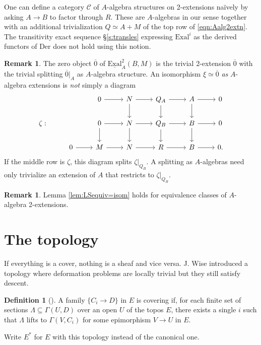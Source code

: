 \documentclass[11pt,reqno]{amsart}
\theoremstyle{definition}
\newtheorem{definition}[theorem]{Definition}
\newtheorem{remark}[theorem]{Remark}
\newcommand{\Der}{\textrm{Der}}
\newcommand{\EExal}{\underline{\textrm{Exal}}}
\newcommand{\Exal}{\textrm{Exal}}
\newcommand{\cal}[1]{\ensuremath{\mathcal{#1}}}
\renewcommand{\bar}[1]{\overline{#1}}
\begin{document}
One can define a category $\cal C$ of $A$-algebra structures on 2-extensions na\"ively by asking $A \to B$ to factor through $R$. These are $A$-algebras in our sense together with an additional trivialization $Q \simeq A+M$ of the top row of \eqref{eqn:Aalg2extn}. The transitivity exact sequence \S \ref{s:transles} expressing $\Exal^i$ as the derived functors of $\Der$ does not hold using this notion. 



\begin{remark}
The zero object $\bar 0$ of $\EExal_A^2(B, M)$ is the trivial 2-extension $\bar 0$ with the trivial splitting $\bar 0|_A$ as $A$-algebra structure. An isomorphism $\xi \simeq \bar 0$ \emph{as} $A$-algebra extensions is \emph{not} simply a diagram
\[\begin{tikzcd}
 &&0 \ar[r] &N \ar[r] \ar[d] &Q_A \ar[r] \ar[d] &A \ar[r] \ar[d] &0 \\
\zeta : &&0 \ar[r] \ar[d] &N \ar[r] \ar[d] &Q_B \ar[r] \ar[d] &B \ar[r] \ar[d] &0 \\
&0 \ar[r] &M \ar[r] &N \ar[r] &R \ar[r] &B \ar[r] &0.
\end{tikzcd}\]
If the middle row is $\zeta$, this diagram splits $\zeta|_{Q_B}$. A splitting as $A$-algebras need only trivialize an extension of $A$ that restricts to $\zeta|_{Q_B}$.  
\end{remark}


\begin{remark}
Lemma \ref{lem:LSequiv=isom} holds for equivalence classes of $A$-algebra 2-extensions. 
\end{remark}






\section{The topology}


If everything is a cover, nothing is a sheaf and vice versa. J. Wise introduced a topology where deformation problems are locally trivial but they still satisfy descent. 

\begin{definition}[{\cite{wisealgs1}}]\label{defn:wisetop}
A family $\{C_i \to D\}$ in $E$ is covering if, for each finite set of sections $\Lambda \subseteq \Gamma(U, D)$ over an open $U$ of the topos $E$, there exists a single $i$ such that $\Lambda$ lifts to $\Gamma(V, C_i)$ for some epimorphism $V \to U$ in $E$. 

Write $E^*$ for $E$ with this topology instead of the canonical one. 

\end{definition}
\end{document}
